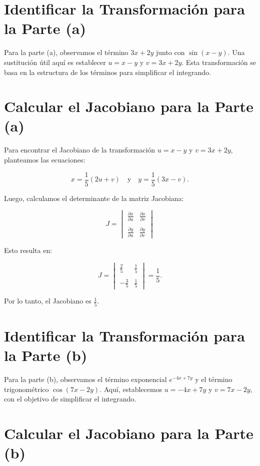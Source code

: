 \section*{Identificar la Transformación para la Parte (a)}

Para la parte (a), observamos el término \(3x + 2y\) junto con \(\sin(x-y)\). Una sustitución útil aquí es establecer \(u = x - y\) y \(v = 3x + 2y\). Esta transformación se basa en la estructura de los términos para simplificar el integrando.

\section*{Calcular el Jacobiano para la Parte (a)}

Para encontrar el Jacobiano de la transformación \(u = x - y\) y \(v = 3x + 2y\), planteamos las ecuaciones:

\[
x = \frac{1}{5}(2u + v) \quad \text{y} \quad y = \frac{1}{5}(3x - v).
\]

Luego, calculamos el determinante de la matriz Jacobiana:

\[
J = 
\begin{vmatrix}
\frac{\partial x}{\partial u} & \frac{\partial x}{\partial v} \\\\
\frac{\partial y}{\partial u} & \frac{\partial y}{\partial v}
\end{vmatrix}
\]

Esto resulta en:

\[
J = \begin{vmatrix}
\frac{2}{5} & \frac{1}{5} \\\\
-\frac{3}{5} & \frac{1}{5}
\end{vmatrix}
= \frac{1}{5}.
\]

Por lo tanto, el Jacobiano es \(\frac{1}{5}\).

\section*{Identificar la Transformación para la Parte (b)}

Para la parte (b), observamos el término exponencial \(e^{-4x+7y}\) y el término trigonométrico \(\cos(7x - 2y)\). Aquí, establecemos \(u = -4x + 7y\) y \(v = 7x - 2y\), con el objetivo de simplificar el integrando.

\section*{Calcular el Jacobiano para la Parte (b)}

